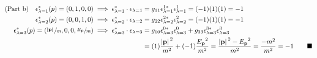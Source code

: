 \documentclass{article}
\begin{document}
\begin{align*}
  \qq*{(Part b)} \epsilon_{\lambda=1}^*(p)=(0,1,0,0)\implies\epsilon_{\lambda=1}^*\cdot\epsilon_{\lambda=1}                             & =g_{11}\epsilon_{\lambda=1}^{1*}\epsilon_{\lambda=1}^1=(-1)(1)(1)
  =-1                                                                                                                                                                                                                                                                                          \\
  \epsilon_{\lambda=2}^*(p)=(0,0,1,0)\implies\epsilon_{\lambda=2}^*\cdot\epsilon_{\lambda=2}                                            & =g_{22}\epsilon_{\lambda=2}^{2*}\epsilon_{\lambda=2}^2=(-1)(1)(1)
  =-1                                                                                                                                                                                                                                                                                          \\
  \epsilon_{\lambda=3}^*(p)=(\sfrac{\abs*{\vb{p}}}{m},0,0,\sfrac{E_{\vb{p}}}{m})\implies\epsilon_{\lambda=3}^*\cdot\epsilon_{\lambda=3} & =g_{00}\epsilon_{\lambda=3}^{0*}\epsilon_{\lambda=3}^0+g_{33}\epsilon_{\lambda=3}^{3*}\epsilon_{\lambda=3}^3                                         \\
                                                                                                                                        & =(1)\frac{{\abs*{\vb{p}}}^2}{m^2}+(-1)\frac{{E_{\vb{p}}}^2}{m^2}=\frac{{\abs*{\vb{p}}}^2-{E_{\vb{p}}}^2}{m^2}=\frac{-m^2}{m^2}=-1 \qquad\blacksquare \\
\end{align*}
\end{document}
